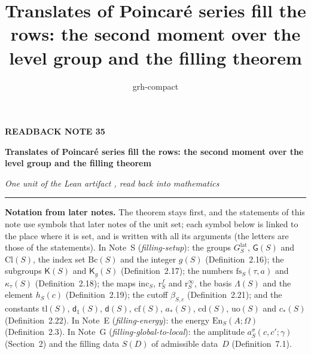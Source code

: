 \documentclass[11pt,a4paper]{article}
\title{Translates of Poincaré series fill the rows: the second moment over the level group and the filling theorem}
\author{grh-compact}
\date{}
\theoremstyle{plainx}
\theoremstyle{uprightx}
\newcommand{\gS}[1]{g(#1)}                          %
\newcommand{\GFin}[1]{G^{\mathrm{lat}}_{#1}}        %
\newcommand{\GRes}[1]{\mathsf{G}(#1)}               %
\newcommand{\Cl}[1]{\mathrm{Cl}(#1)}                %
\newcommand{\Bc}[1]{\mathrm{Bc}(#1)}                %
\newcommand{\KS}[1]{\mathsf{K}(#1)}                          %
\newcommand{\KgS}[1]{\mathsf{K}_g(#1)}                       %
\newcommand{\kapS}[2]{\kappa_{#2}(#1)}              %
\newcommand{\latB}[1]{\Lambda(#1)}                  %
\newcommand{\rinf}[1]{\mathrm{r}^{\infty}_{#1}}     %
\newcommand{\rfin}[1]{\mathrm{r}^{f}_{#1}}          %
\newcommand{\incH}[1]{\mathrm{inc}_{#1}}            %
\newcommand{\hc}[2]{h_{#1}(#2)}                     %
\newcommand{\cutoff}[2]{\beta_{#1,#2}}              %
\newcommand{\amp}[5]{a^{#1}_{#2}(#3,#4;#5)}         %
\newcommand{\siegC}[1]{c_{*}(#1)}                   %
\newcommand{\packC}[1]{a_{*}(#1)}                   %
\newcommand{\uord}[1]{\mathrm{uo}(#1)}              %
\newcommand{\cdim}[1]{\mathrm{cd}(#1)}              %
\newcommand{\mainE}[1]{\mathsf{d}(#1)}              %
\newcommand{\besE}[1]{\mathsf{d}_{1}(#1)}           %
\newcommand{\tailS}[1]{\mathrm{tl}(#1)}             %
\newcommand{\codimF}[1]{\mathrm{cf}(#1)}            %
\newcommand{\fscale}[3]{\mathrm{fs}_{#1}(#2,#3)}    %
\newcommand{\energy}[3]{\mathrm{En}_{#1}(#2;#3)}    %
\newcommand{\SD}[1]{S(#1)}                          %
\begin{document}
\color{ink}

{\raggedright
{\sffamily\bfseries\fontsize{7.2}{9}\selectfont\color{leancol}READBACK NOTE 35\par}
\vspace{5pt}
{\fontsize{21.5}{25.5}\selectfont\bfseries Translates of Poincaré series fill the rows: the second moment over the
level group and the filling theorem\par}
\vspace{5pt}
{\fontsize{12.4}{16}\selectfont\itshape\color{inksoft} One unit of the Lean artifact \ArtifactName, read back into
mathematics\par}}
\vspace{8pt}
{\color{rulegrey}\hrule height 0.6pt}
\vspace{7pt}
\thispagestyle{empty}
\providecommand{\notelink}[3]{\href{https://nasqret.github.io/riemann-rev/writeup/browse/notes/#1.pdf\#nameddest=#2}{#3}}

\textbf{Notation from later notes.} The theorem stays first, and the statements of this note use symbols that later
notes of the unit set; each symbol below is linked to the place where it is set, and is written with all its arguments
(the letters are those of the statements). In Note~S (\emph{filling-setup}): the groups
\notelink{filling-setup}{theorem.2.16}{$\GFin{S}$}, \notelink{filling-setup}{theorem.2.16}{$\GRes{S}$} and
\notelink{filling-setup}{theorem.2.16}{$\Cl{S}$}, the index set \notelink{filling-setup}{theorem.2.16}{$\Bc{S}$} and the
integer \notelink{filling-setup}{theorem.2.16}{$\gS{S}$} (Definition~2.16); the subgroups
\notelink{filling-setup}{theorem.2.17}{$\KS{S}$} and \notelink{filling-setup}{theorem.2.17}{$\KgS{S}$} (Definition~2.17);
the numbers \notelink{filling-setup}{theorem.2.18}{$\fscale{S}{\tau}{a}$} and \notelink{filling-setup}{theorem.2.18}{$\kapS{S}{\tau}$}
(Definition~2.18); the maps \notelink{filling-setup}{theorem.2.19}{$\incH{S}$}, \notelink{filling-setup}{theorem.2.19}{$\rfin{S}$}
and \notelink{filling-setup}{theorem.2.19}{$\rinf{S}$}, the basis \notelink{filling-setup}{theorem.2.19}{$\latB{S}$} and the element
\notelink{filling-setup}{theorem.2.19}{$\hc{S}{c}$} (Definition~2.19); the cutoff \notelink{filling-setup}{theorem.2.21}{$\cutoff{S}{c}$}
(Definition~2.21); and the constants \notelink{filling-setup}{theorem.2.22}{$\tailS{S}$}, \notelink{filling-setup}{theorem.2.22}{$\besE{S}$},
\notelink{filling-setup}{theorem.2.22}{$\mainE{S}$}, \notelink{filling-setup}{theorem.2.22}{$\codimF{S}$},
\notelink{filling-setup}{theorem.2.22}{$\packC{S}$}, \notelink{filling-setup}{theorem.2.22}{$\cdim{S}$},
\notelink{filling-setup}{theorem.2.22}{$\uord{S}$} and \notelink{filling-setup}{theorem.2.22}{$\siegC{S}$} (Definition~2.22).
In Note~E (\emph{filling-energy}): the energy \notelink{filling-energy}{theorem.2.3}{$\energy{S}{A}{\Omega}$} (Definition~2.3). In
Note~G (\emph{filling-global-to-local}): the amplitude \notelink{filling-global-to-local}{section.2}{$\amp{\sigma}{S}{c}{c'}{\gamma}$}
(Section~2) and the filling data \notelink{filling-global-to-local}{theorem.7.1}{$\SD{D}$} of admissible data~$D$ (Definition~7.1).
\end{document}
